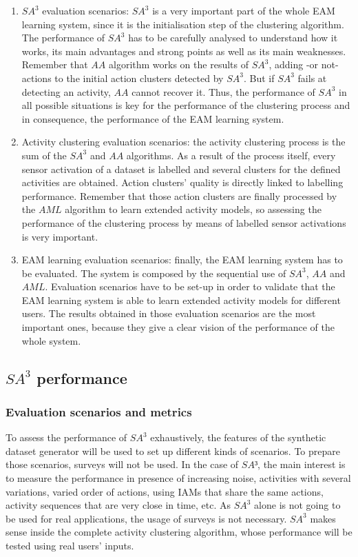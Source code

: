 \begin{enumerate}
 \item $SA^3$ evaluation scenarios: $SA^3$ is a very important part of the whole EAM learning system, since it is the initialisation step of the clustering algorithm. The performance of $SA^3$ has to be carefully analysed to understand how it works, its main advantages and strong points as well as its main weaknesses. Remember that $AA$ algorithm works on the results of $SA^3$, adding -or not- actions to the initial action clusters detected by $SA^3$. But if $SA^3$ fails at detecting an activity, $AA$ cannot recover it. Thus, the performance of $SA^3$ in all possible situations is key for the performance of the clustering process and in consequence, the performance of the EAM learning system.
 \item Activity clustering evaluation scenarios: the activity clustering process is the sum of the $SA^3$ and $AA$ algorithms. As a result of the process itself, every sensor activation of a dataset is labelled and several clusters for the defined activities are obtained. Action clusters' quality is directly linked to labelling performance. Remember that those action clusters are finally processed by the $AML$ algorithm to learn extended activity models, so assessing the performance of the clustering process by means of labelled sensor activations is very important.
 \item EAM learning evaluation scenarios: finally, the EAM learning system has to be evaluated. The system is composed by the sequential use of $SA^3$, $AA$ and $AML$. Evaluation scenarios have to be set-up in order to validate that the EAM learning system is able to learn extended activity models for different users. The results obtained in those evaluation scenarios are the most important ones, because they give a clear vision of the performance of the whole system.
\end{enumerate}

\subsection{$SA^3$ performance}
\label{subsec:evaluation:sa3}

\subsubsection{Evaluation scenarios and metrics}
\label{subsubsec:evaluation:sa3:scenarios}
To assess the performance of $SA^3$ exhaustively, the features of the synthetic dataset generator will be used to set up different kinds of scenarios. To prepare those scenarios, surveys will not be used. In the case of $SA³$, the main interest is to measure the performance in presence of increasing noise, activities with several variations, varied order of actions, using IAMs that share the same actions, activity sequences that are very close in time, etc. As $SA^3$ alone is not going to be used for real applications, the usage of surveys is not necessary. $SA^3$ makes sense inside the complete activity clustering algorithm, whose performance will be tested using real users' inputs.

